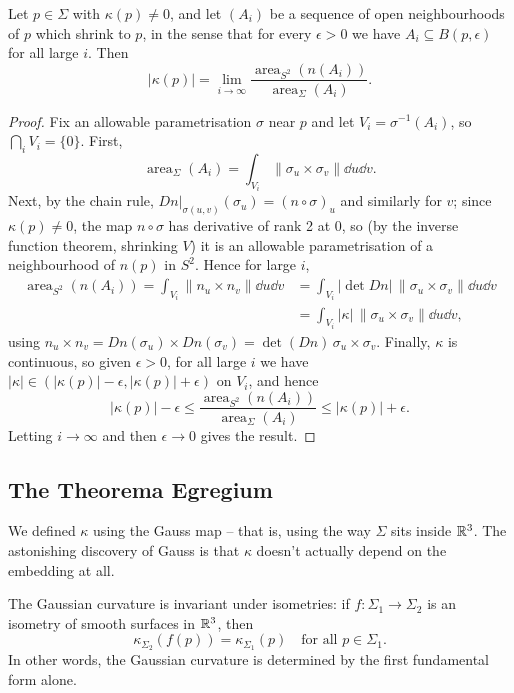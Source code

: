 \documentclass[a4paper]{scrartcl}
\begin{document}
\begin{theorem}\label{thm:curvaturearea}
    Let $p \in \Sigma$ with $\kappa(p) \neq 0$, and let $(A_i)$ be a sequence of open neighbourhoods of $p$ which shrink to $p$, in the sense that for every $\epsilon > 0$ we have $A_i \subseteq B(p, \epsilon)$ for all large $i$. Then
    $$
    |\kappa(p)| = \lim_{i \rightarrow \infty} \frac{\operatorname{area}_{S^2}(n(A_i))}{\operatorname{area}_\Sigma(A_i)}.
    $$
\end{theorem}
\begin{proof}
    Fix an allowable parametrisation $\sigma$ near $p$ and let $V_i = \sigma^{-1}(A_i)$, so $\bigcap_i V_i = \{0\}$. First,
    $$
    \operatorname{area}_\Sigma(A_i) = \int_{V_i} \|\sigma_u \times \sigma_v\| \dd u \dd v.
    $$
    Next, by the chain rule, $\left.Dn\right|_{\sigma(u,v)}(\sigma_u) = (n \circ \sigma)_u$ and similarly for $v$; since $\kappa(p) \neq 0$, the map $n \circ \sigma$ has derivative of rank 2 at $0$, so (by the inverse function theorem, shrinking $V$) it is an allowable parametrisation of a neighbourhood of $n(p)$ in $S^2$. Hence for large $i$,
    \begin{align*}
    \operatorname{area}_{S^2}(n(A_i)) = \int_{V_i} \|n_u \times n_v\| \dd u \dd v &= \int_{V_i} |{\det Dn}| \, \|\sigma_u \times \sigma_v\| \dd u \dd v \\
    &= \int_{V_i} |\kappa| \, \|\sigma_u \times \sigma_v\| \dd u \dd v,
    \end{align*}
    using $n_u \times n_v = Dn(\sigma_u) \times Dn(\sigma_v) = \det(Dn) \, \sigma_u \times \sigma_v$.
    Finally, $\kappa$ is continuous, so given $\epsilon > 0$, for all large $i$ we have $|\kappa| \in (|\kappa(p)| - \epsilon, |\kappa(p)| + \epsilon)$ on $V_i$, and hence
    $$
    |\kappa(p)| - \epsilon \leq \frac{\operatorname{area}_{S^2}(n(A_i))}{\operatorname{area}_\Sigma(A_i)} \leq |\kappa(p)| + \epsilon.
    $$
    Letting $i \rightarrow \infty$ and then $\epsilon \rightarrow 0$ gives the result.
\end{proof}

\subsection{The Theorema Egregium}

We defined $\kappa$ using the Gauss map -- that is, using the way $\Sigma$ sits inside $\mathbb{R}^3$. The astonishing discovery of Gauss is that $\kappa$ doesn't actually depend on the embedding at all.

\begin{theorem}\label{thm:egregium}
    The Gaussian curvature is invariant under isometries: if $f: \Sigma_1 \rightarrow \Sigma_2$ is an isometry of smooth surfaces in $\mathbb{R}^3$, then
    $$
    \kappa_{\Sigma_2}(f(p)) = \kappa_{\Sigma_1}(p) \quad \text{for all } p \in \Sigma_1.
    $$
    In other words, the Gaussian curvature is determined by the first fundamental form alone.
\end{theorem}
\end{document}
